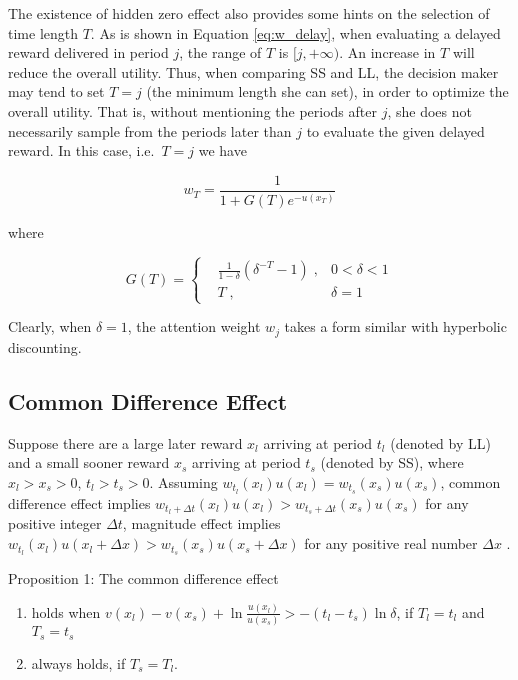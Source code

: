 \documentclass[
  12pt,
]{article}
\begin{document}
The existence of hidden zero effect also provides some hints on the
selection of time length \(T\). As is shown in Equation
\ref{eq:w_delay}, when evaluating a delayed reward delivered in period
\(j\), the range of \(T\) is \([j,+\infty)\). An increase in \(T\) will
reduce the overall utility. Thus, when comparing SS and LL, the decision
maker may tend to set \(T=j\) (the minimum length she can set), in order
to optimize the overall utility. That is, without mentioning the periods
after \(j\), she does not necessarily sample from the periods later than
\(j\) to evaluate the given delayed reward. In this case, i.e.~\(T=j\)
we have

\[
w_T = \frac{1}{1+G(T)e^{-u(x_T)}}
\]

where

\[
G(T) = \left\{ \begin{aligned}
& \frac{1}{1-\delta}(\delta^{-T}-1) \; ,& 0<\delta<1\\
& T\; ,& \delta=1\
\end{aligned}
\right.
\]

Clearly, when \(\delta=1\), the attention weight \(w_j\) takes a form
similar with hyperbolic discounting.

\hypertarget{common-difference-effect}{%
\subsection{Common Difference Effect}\label{common-difference-effect}}

Suppose there are a large later reward \(x_l\) arriving at period
\(t_l\) (denoted by LL) and a small sooner reward \(x_s\) arriving at
period \(t_s\) (denoted by SS), where \(x_l>x_s>0\), \(t_l>t_s>0\).
Assuming \(w_{t_l}(x_l)u(x_l)=w_{t_s}(x_s)u(x_s)\), common difference
effect implies
\(w_{t_l+\Delta t}(x_l)u(x_l)>w_{t_s+\Delta t}(x_s)u(x_s)\) for any
positive integer \(\Delta t\), magnitude effect implies
\(w_{t_l}(x_l)u(x_l+\Delta x)>w_{t_s}(x_s)u(x_s+\Delta x)\) for any
positive real number \(\Delta x\) \citep{loewenstein_anomalies_1992}.

Proposition 1: The common difference effect

\begin{enumerate}
\def\labelenumi{(\arabic{enumi})}
\item
  holds when
  \(v(x_l)-v(x_s)+\ln\frac{u(x_l)}{u(x_s)}>-(t_l-t_s)\ln\delta\), if
  \(T_l = t_l\) and \(T_s=t_s\)
\item
  always holds, if \(T_s = T_l\).
\end{enumerate}
\end{document}
